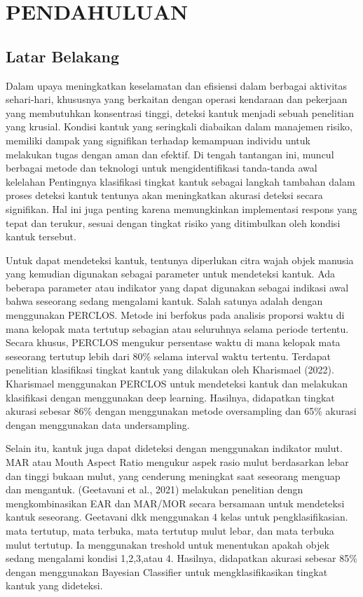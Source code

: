 \chapter{PENDAHULUAN}
\label{chap:pendahuluan}

\section{Latar Belakang}
\label{sec:latarbelakang}
Dalam upaya meningkatkan keselamatan dan efisiensi dalam berbagai aktivitas sehari-hari, khususnya yang berkaitan dengan operasi kendaraan dan pekerjaan yang membutuhkan konsentrasi tinggi, deteksi kantuk menjadi sebuah penelitian yang krusial. Kondisi kantuk yang seringkali diabaikan dalam manajemen risiko, memiliki dampak yang signifikan terhadap kemampuan individu untuk melakukan tugas dengan aman dan efektif. Di tengah tantangan ini, muncul berbagai metode dan teknologi untuk mengidentifikasi tanda-tanda awal kelelahan Pentingnya klasifikasi tingkat kantuk sebagai langkah tambahan dalam proses deteksi kantuk tentunya akan meningkatkan akurasi deteksi secara signifikan. Hal ini juga penting karena memungkinkan implementasi respons yang tepat dan terukur, sesuai dengan tingkat risiko yang ditimbulkan oleh kondisi kantuk tersebut.

Untuk dapat mendeteksi kantuk, tentunya diperlukan citra wajah objek manusia yang kemudian digunakan sebagai parameter untuk mendeteksi kantuk. Ada beberapa parameter atau indikator yang dapat digunakan sebagai indikasi awal bahwa seseorang sedang mengalami kantuk. Salah satunya adalah dengan menggunakan PERCLOS. Metode ini berfokus pada
analisis proporsi waktu di mana kelopak mata tertutup sebagian atau seluruhnya selama periode tertentu. Secara khusus, PERCLOS mengukur persentase waktu di mana kelopak mata seseorang tertutup lebih dari 80\% selama interval waktu tertentu. Terdapat penelitian klasifikasi tingkat kantuk yang dilakukan oleh Kharismael (2022). Kharismael menggunakan PERCLOS untuk mendeteksi kantuk dan melakukan klasifikasi dengan menggunakan deep learning. Hasilnya, didapatkan tingkat akurasi sebesar 86\% dengan menggunakan metode oversampling dan 65\% akurasi dengan menggunakan data undersampling.

Selain itu, kantuk juga dapat dideteksi dengan menggunakan indikator mulut. MAR atau Mouth Aspect Ratio mengukur aspek rasio mulut berdasarkan lebar dan tinggi bukaan mulut, yang cenderung meningkat saat seseorang menguap dan mengantuk. (Geetavani et al., 2021) melakukan penelitian dengn mengkombinasikan EAR dan MAR/MOR secara bersamaan untuk mendeteksi kantuk seseorang. Geetavani dkk menggunakan 4 kelas untuk pengklasifikasian. mata tertutup, mata terbuka, mata tertutup mulut lebar, dan mata terbuka mulut tertutup. Ia menggunakan treshold untuk menentukan apakah objek sedang mengalami kondisi 1,2,3,atau 4. Hasilnya, didapatkan akurasi sebesar 85\% dengan menggunakan Bayesian Classifier untuk mengklasifikasikan tingkat kantuk yang dideteksi.

